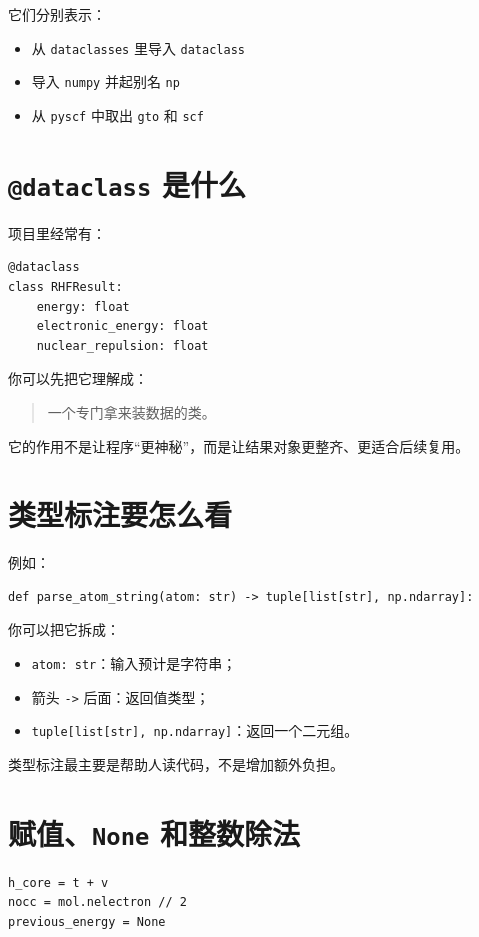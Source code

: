 \documentclass[UTF8,11pt,fontset=fandol]{ctexbook}
\begin{document}
它们分别表示：
\begin{itemize}
  \item 从 \texttt{dataclasses} 里导入 \texttt{dataclass}
  \item 导入 \texttt{numpy} 并起别名 \texttt{np}
  \item 从 \texttt{pyscf} 中取出 \texttt{gto} 和 \texttt{scf}
\end{itemize}

\section{\texttt{@dataclass} 是什么}

项目里经常有：
\begin{lstlisting}[style=pythonstyle]
@dataclass
class RHFResult:
    energy: float
    electronic_energy: float
    nuclear_repulsion: float
\end{lstlisting}

你可以先把它理解成：

\begin{quote}
一个专门拿来装数据的类。
\end{quote}

它的作用不是让程序“更神秘”，而是让结果对象更整齐、更适合后续复用。

\section{类型标注要怎么看}

例如：
\begin{lstlisting}[style=pythonstyle]
def parse_atom_string(atom: str) -> tuple[list[str], np.ndarray]:
\end{lstlisting}

你可以把它拆成：
\begin{itemize}
  \item \texttt{atom: str}：输入预计是字符串；
  \item 箭头 \texttt{->} 后面：返回值类型；
  \item \texttt{tuple[list[str], np.ndarray]}：返回一个二元组。
\end{itemize}

类型标注最主要是帮助人读代码，不是增加额外负担。

\section{赋值、\texttt{None} 和整数除法}

\begin{lstlisting}[style=pythonstyle]
h_core = t + v
nocc = mol.nelectron // 2
previous_energy = None
\end{lstlisting}
\end{document}
